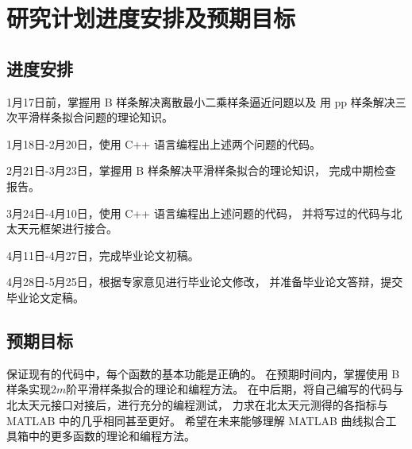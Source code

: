 \section{研究计划进度安排及预期目标}

\subsection{进度安排}
1月17日前，掌握用 B 样条解决离散最小二乘样条逼近问题以及
用 pp 样条解决三次平滑样条拟合问题的理论知识。

1月18日-2月20日，使用 C++ 语言编程出上述两个问题的代码。

2月21日-3月23日，掌握用 B 样条解决平滑样条拟合的理论知识，
完成中期检查报告。

3月24日-4月10日，使用 C++ 语言编程出上述问题的代码，
并将写过的代码与北太天元框架进行接合。

4月11日-4月27日，完成毕业论文初稿。

4月28日-5月25日，根据专家意见进行毕业论文修改，
并准备毕业论文答辩，提交毕业论文定稿。
\subsection{预期目标}
保证现有的代码中，每个函数的基本功能是正确的。
在预期时间内，掌握使用 B 样条实现$2m$阶平滑样条拟合的理论和编程方法。
在中后期，将自己编写的代码与北太天元接口对接后，进行充分的编程测试，
力求在北太天元测得的各指标与 MATLAB 中的几乎相同甚至更好。
希望在未来能够理解 MATLAB 曲线拟合工具箱中的更多函数的理论和编程方法。


